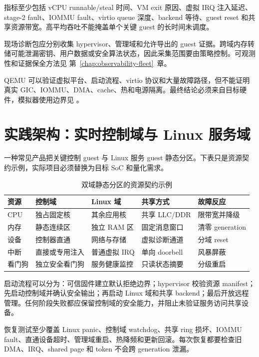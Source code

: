 指标至少包括 vCPU runnable/steal 时间、VM exit 原因、虚拟 IRQ 注入延迟、stage-2 fault、IOMMU fault、virtio queue 深度、backend 等待、guest reset 和共享资源带宽。高平均吞吐不能掩盖单个关键 guest 的长时间未调度。

现场诊断包应分别收集 hypervisor、管理域和允许导出的 guest 证据。跨域内存转储可能泄漏密钥、用户数据或安全算法状态，因此采集范围要由策略控制。可观测性和证据保全方法见 \mbox{第~\ref{chap:observability-fleet}~章}。

QEMU 可以验证虚拟平台、启动流程、virtio 协议和大量故障路径，但不能证明真实 GIC、IOMMU、DMA、cache、热和电源隔离。最终结论必须来自目标硬件，模拟器使用边界见 \cite{qemu-system-doc}。

\section{实践架构：实时控制域与 Linux 服务域}

一种常见产品把关键控制 guest 与 Linux 服务 guest 静态分区。下表只是资源契约示例，实际项目必须替换为目标 SoC 和量化需求。

\begin{table}[H]
  \centering
  \caption{双域静态分区的资源契约示例}
  \begin{tabular}{p{21mm}p{26mm}p{29mm}p{28mm}p{32mm}}
    \hline
    资源 & 控制域 & Linux 域 & 共享方式 & 故障反应 \\
    \hline
    CPU & 独占固定核 & 其余应用核 & 共享 LLC/DDR & 限带宽并降级 \\
    内存 & 静态连续区 & 独立 RAM 区 & 固定消息窗口 & 清零 generation \\
    设备 & 控制器直通 & 网络与存储 & 虚拟诊断通道 & 分域 reset \\
    中断 & 直接或专用注入 & 普通虚拟 IRQ & 单向 doorbell & 风暴屏蔽 \\
    看门狗 & 独立安全看门狗 & 服务健康监控 & 只读状态摘要 & 分级重启 \\
    \hline
  \end{tabular}
\end{table}

启动流程可以分为：可信固件建立默认拒绝边界；hypervisor 校验资源 manifest；先启动控制域并确认安全输出；再启动 Linux 域和共享 backend；最后开放远程管理。任何阶段失败都应保留控制域的安全能力，并阻止未验证服务访问共享设备。

恢复测试至少覆盖 Linux panic、控制域 watchdog、共享 ring 损坏、IOMMU fault、直通设备超时、管理域重启、热降频和更新回滚。每次恢复都要检查旧 DMA、IRQ、shared page 和 token 不会跨 generation 泄漏。

